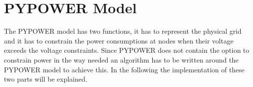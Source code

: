 \documentclass[a4paper]{article}
\begin{document}

\newpage

\appendix

\section{PYPOWER Model}
The PYPOWER model has two functions, it has to represent the physical grid and it has to constrain the power consumptions at 
nodes when their voltage exceeds the voltage constraints. Since PYPOWER does not contain the option to constrain power in the way
needed an algorithm has to be written around the PYPOWER model to achieve this. In the following the implementation of these two parts
will be explained.\\
\end{document}
